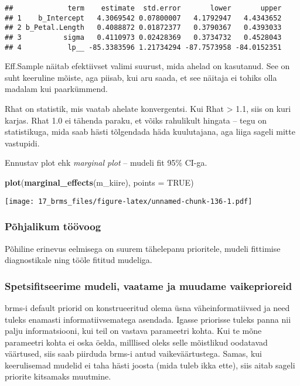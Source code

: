 \documentclass[]{article}
\newenvironment{Shaded}{\begin{snugshade}}{\end{snugshade}}
\newcommand{\KeywordTok}[1]{\textcolor[rgb]{0.13,0.29,0.53}{\textbf{#1}}}
\newcommand{\DataTypeTok}[1]{\textcolor[rgb]{0.13,0.29,0.53}{#1}}
\newcommand{\OtherTok}[1]{\textcolor[rgb]{0.56,0.35,0.01}{#1}}
\newcommand{\NormalTok}[1]{#1}
\begin{document}
\begin{verbatim}
##             term    estimate  std.error       lower       upper
## 1    b_Intercept   4.3069542 0.07800007   4.1792947   4.4343652
## 2 b_Petal.Length   0.4088872 0.01872377   0.3790367   0.4393033
## 3          sigma   0.4110973 0.02428369   0.3734732   0.4528043
## 4           lp__ -85.3383596 1.21734294 -87.7573958 -84.0152351
\end{verbatim}

Eff.Sample näitab efektiivset valimi suurust, mida ahelad on kasutanud.
See on suht keeruline mõiste, aga piisab, kui aru saada, et see näitaja
ei tohiks olla madalam kui paarkümmend.

Rhat on statistik, mis vaatab ahelate konvergentsi. Kui Rhat
\textgreater{} 1.1, siis on kuri karjas. Rhat 1.0 ei tähenda paraku, et
võiks rahulikult hingata -- tegu on statistikuga, mida saab hästi
tõlgendada häda kuulutajana, aga liiga sageli mitte vastupidi.

Ennustav plot ehk \emph{marginal plot} -- mudeli fit 95\% CI-ga.

\begin{Shaded}
\begin{Highlighting}[]
\KeywordTok{plot}\NormalTok{(}\KeywordTok{marginal_effects}\NormalTok{(m_kiire), }\DataTypeTok{points =} \OtherTok{TRUE}\NormalTok{)}
\end{Highlighting}
\end{Shaded}

\texttt{[image: 17\_brms\_files/figure-latex/unnamed-chunk-136-1.pdf]}

\subsubsection{Põhjalikum töövoog}\label{pohjalikum-toovoog}

Põhiline erinevus eelmisega on suurem tähelepanu prioritele, mudeli
fittimise diagnostikale ning tööle fititud mudeliga.

\subsubsection{Spetsifitseerime mudeli, vaatame ja muudame
vaikeprioreid}\label{spetsifitseerime-mudeli-vaatame-ja-muudame-vaikeprioreid}

brms-i default priorid on konstrueeritud olema üsna väheinformatiivsed
ja need tuleks enamasti informatiivsematega asendada. Igasse priorisse
tuleks panna nii palju informatsiooni, kui teil on vastava parameetri
kohta. Kui te mõne parameetri kohta ei oska öelda, milllised oleks selle
mõistlikud oodatavad väärtused, siis saab piirduda brms-i antud
vaikeväärtustega. Samas, kui keerulisemad mudelid ei taha hästi joosta
(mida tuleb ikka ette), siis aitab sageli priorite kitsamaks muutmine.
\end{document}
